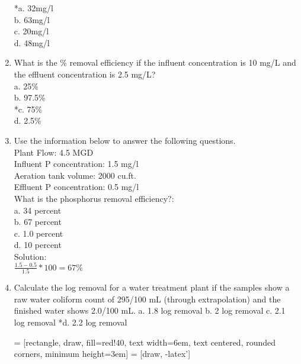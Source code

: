 \documentclass{article}
\begin{document}
\begin{enumerate}
*a. 32mg/l \\
b. 63mg/l \\
c. 20mg/l \\
d. 48mg/l \\

\item What is the \% removal efficiency if the influent concentration is 10 mg/L and the effluent concentration is 2.5 mg/L? \\

a. 25\% \\
b. 97.5\% \\
*c. 75\% \\
d. 2.5\% \\



\item Use the information below to answer the following questions.\\
Plant Flow: 4.5 MGD\\
Influent P concentration: 1.5 mg/l\\
Aeration tank volume: 2000 cu.ft.\\
Effluent P concentration: 0.5 mg/l\\
What is the phosphorus removal efficiency?:\\
a. 34 percent\\
b. 67 percent\\
c. 1.0 percent\\
d. 10 percent\\
Solution:\\
$\frac{1.5-0.5}{1.5}*100=\boxed{67\%}$

\item Calculate the log removal for a water treatment plant if the samples show a raw water coliform count of 295/100 mL (through extrapolation) and the finished water shows 2.0/100 mL.
a. 1.8 log removal
b. 2 log removal
c. 2.1 log removal
*d. 2.2 log removal

 = [rectangle, draw, fill=red!40, 
    text width=6em, text centered, rounded corners, minimum height=3em]
 = [draw, -latex']
\begin{figure}[!h]
\centering
{}
\end{figure}



\end{enumerate}
\end{document}
